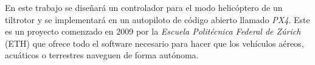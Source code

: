 En este trabajo se diseñará un controlador para el modo helicóptero de un tiltrotor y se implementará en un autopiloto de código abierto llamado \textit{PX4}. Este es un proyecto comenzado en 2009 por la \textit{Escuela Politécnica Federal de Zúrich} (ETH) que ofrece todo el software necesario para hacer que los vehículos aéreos, acuáticos o terrestres naveguen de forma autónoma. 

~\cite{windup}

\endinput
